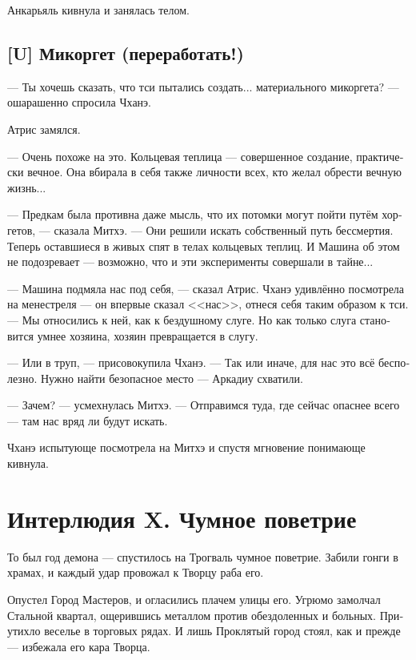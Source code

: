 \documentclass[a4paper,12pt,fleqn]{book}\usepackage{polyglossia}\setdefaultlanguage[babelshorthands=true]{russian}\setotherlanguage{english}\defaultfontfeatures{Ligatures=TeX,Mapping=tex-text}\usepackage{xcolor}\newcommand{\ml}[3]{#2}
\newcommand{\textspace}{\vspace{1em}{\centering\Large\bfseries<...>\par}\vspace{1em}}
\begin{document}
Анкарьяль кивнула и занялась телом.

\section{[U] Микоргет (переработать!)}

\textspace

--- Ты хочешь сказать, что тси пытались создать... материального микоргета? --- ошарашенно спросила Чханэ.

Атрис замялся.

--- Очень похоже на это.
Кольцевая теплица --- совершенное создание, практически вечное.
Она вбирала в себя также личности всех, кто желал обрести вечную жизнь...

--- Предкам была противна даже мысль, что их потомки могут пойти путём хоргетов, --- сказала Митхэ.
--- Они решили искать собственный путь бессмертия.
Теперь оставшиеся в живых спят в телах кольцевых теплиц.
И Машина об этом не подозревает --- возможно, что и эти эксперименты совершали в тайне...

--- Машина подмяла нас под себя, --- сказал Атрис.
Чханэ удивлённо посмотрела на менестреля --- он впервые сказал <<нас>>, отнеся себя таким образом к тси.
--- Мы относились к ней, как к бездушному слуге.
Но как только слуга становится умнее хозяина, хозяин превращается в слугу.

--- Или в труп, --- присовокупила Чханэ.
--- Так или иначе, для нас это всё бесполезно.
Нужно найти безопасное место --- Аркадиу схватили.

--- Зачем? --- усмехнулась Митхэ.
--- Отправимся туда, где сейчас опаснее всего --- там нас вряд ли будут искать.

Чханэ испытующе посмотрела на Митхэ и спустя мгновение понимающе кивнула.


\chapter*{Интерлюдия X. Чумное поветрие}

То был год демона --- спустилось на Трогваль чумное поветрие.
Забили гонги в храмах, и каждый удар провожал к Творцу раба его.

Опустел Город Мастеров, и огласились плачем улицы его.
Угрюмо замолчал Стальной квартал, ощерившись металлом против обездоленных и больных.
Приутихло веселье в торговых рядах.
И лишь Проклятый город стоял, как и прежде --- избежала его кара Творца.
\end{document}
